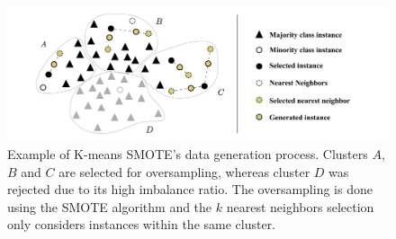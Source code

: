 \documentclass[information,article,submit,moreauthors,pdftex]{Definitions/mdpi}
\begin{document}
\begin{figure}
	\centering
    \captionsetup{justification=centering}
    \caption{Example of K-means SMOTE's data generation
        process. Clusters $A$, $B$ and $C$ are selected for oversampling,
        whereas cluster $D$ was rejected due to its high imbalance ratio. The
        oversampling is done using the SMOTE algorithm and the $k$ nearest
        neighbors selection only considers instances
        within the same cluster.
    \vspace{.2cm}}
	\label{fig:kmeans_smote_example}
	\includegraphics[width=1\linewidth]{../analysis/kmeans_smote_example}
\end{figure}
\end{document}
